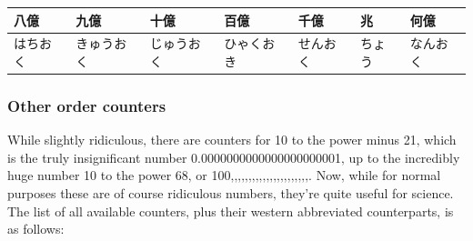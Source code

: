\documentclass[11pt, b5paper, twoside, openright, onecolumn]{book}
\newenvironment{mytabularcentered}[1]{\noindent
\begin{center}\begin{tabular}[h]{#1}}{\end{tabular}\end{center}}
\begin{document}
\smaller
\begin{center}
\begin{mytabularcentered}{| l  l  l  l  l  l  l |}\hline 
\rule{0pt}{2.4ex}八億 & 九億 & 十億 & 百億 & 千億 & 兆 & 何億\\ 
\hline
\rule{0pt}{2.4ex}はちおく & きゅうおく & じゅうおく & ひゃくおき & せんおく & ちょう & なんおく\\ 
\hline 
\end{mytabularcentered}
\end{center}
\larger
\subsubsection{Other order counters}


While slightly ridiculous‚ there are counters for 10 to the power minus 21‚ which is the truly insignificant number 0.0000000000000000000001‚ up to the incredibly huge number 10 to the power 68‚ or 100‚‚‚‚‚‚‚‚‚‚‚‚‚‚‚‚‚‚‚‚‚‚. Now‚ while for normal purposes these are of course ridiculous numbers‚ they’re quite useful for science. The list of all available counters‚ plus their western abbreviated counterparts‚ is as follows:
\end{document}
